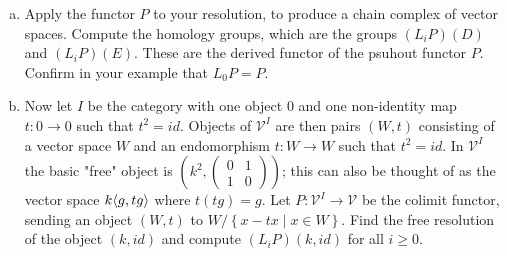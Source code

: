 \documentclass[a4paper, 12pt]{article}
\begin{document}
\begin{problem}{6}
\begin{enumerate}[(a)]
\item Apply the functor \(P\) to your resolution, to produce a chain complex of vector spaces. Compute the homology groups, which are the groups \((L_iP)(D)\) and \((L_iP)(E)\). These are the derived functor of the psuhout functor \(P\). Confirm in your example that \(L_0P=P\). 
\item Now let \(I\) be the category with one object \(0\) and one non-identity map \(t:0\rightarrow 0\) such that \(t^2=id\). Objects of \(\mathcal{V}^I\) are then pairs \((W,t)\) consisting of a vector space \(W\) and an endomorphism \(t:W\rightarrow W\) such that \(t^2=id\). 
In \(\mathcal{V}^I\) the basic "free" object is \((k^2,\begin{pmatrix}
	0&1\\ 
	1&0
\end{pmatrix})\); this can also be thought of as the vector space \(k\langle g,tg\rangle\) where \(t(tg)=g\). Let \(P:\mathcal{V}^I\rightarrow \mathcal{V}\) be the colimit functor, sending an object \((W,t)\) to \(W/\left\{ x-tx\mid x\in W \right\}\). 
Find the free resolution of the object \((k,id)\) and compute \((L_iP)(k,id)\) for all \(i\geq 0\).
\end{enumerate}
\end{problem}
\begin{solution}

\end{solution}
\end{document}
